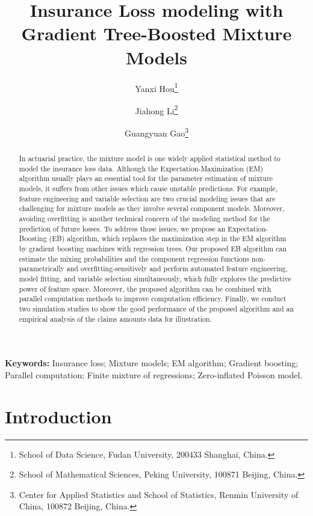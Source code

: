 \documentclass[11pt]{article}
\title{Insurance Loss modeling with Gradient Tree-Boosted Mixture Models}
\author{ Yanxi Hou\footnote{School of Data Science, Fudan University, 200433 Shanghai, China.} \and Jiahong Li\footnote{School of Mathematical Sciences, Peking University, 100871 Beijing, China.} \and Guangyuan Gao\footnote{Center for Applied Statistics and School of Statistics, Renmin University of China, 100872 Beijing, China.}}
\numberwithin{equation}{section}
\begin{document}
\maketitle

\begin{abstract}

In actuarial practice, the mixture model is one widely applied statistical method to model the insurance loss data. 
Although the Expectation-Maximization (EM) algorithm usually plays an essential tool for the parameter estimation of mixture models, it suffers from other issues which cause unstable predictions. 
For example, feature engineering and variable selection are two crucial modeling issues that are challenging for mixture models as they involve several component models. 
Moreover, avoiding overfitting is another technical concern of the modeling method for the prediction of future losses. 
To address those issues, we propose an Expectation-Boosting (EB) algorithm, 
which replaces the maximization step in the EM algorithm by gradient boosting machines with regression trees. 
Our proposed EB algorithm can estimate the mixing probabilities and the component regression functions non-parametrically and overfitting-sensitively and
perform automated feature engineering, model fitting, and variable selection simultaneously, which
fully explores the predictive power of feature space. Moreover, the proposed algorithm can be combined with parallel computation methods to improve computation efficiency.
Finally, we conduct two simulation studies to show the good performance of the proposed algorithm and an empirical analysis of the claims amounts data for illustration. 
\end{abstract}

{\bf Keywords:} Insurance loss; Mixture models; EM algorithm; Gradient boosting; Parallel computation; Finite mixture of regressions; Zero-inflated Poisson model. 

\newpage
\section{Introduction}
\end{document}
